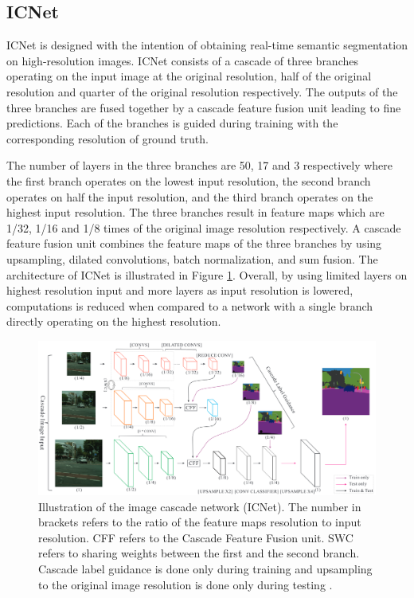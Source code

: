 \subsection{ICNet}

ICNet \cite{DBLP:journals/corr/ZhaoQSSJ17} is designed with the intention of obtaining real-time semantic segmentation on high-resolution images. ICNet consists of a cascade of three branches operating on the input image at the original resolution, half of the original resolution and quarter of the original resolution respectively. The outputs of the three branches are fused together by a cascade feature fusion unit leading to fine predictions. Each of the branches is guided during training with the corresponding resolution of ground truth. 

The number of layers in the three branches are 50, 17 and 3 respectively where the first branch operates on the lowest input resolution, the second branch operates on half the input resolution, and the third branch operates on the highest input resolution. The three branches result in feature maps which are 1/32, 1/16 and 1/8 times of the original image resolution respectively. A cascade feature fusion unit combines the feature maps of the three branches by using upsampling, dilated convolutions, batch normalization, and sum fusion. The architecture of ICNet is illustrated in Figure \ref{Fig:icnet}. Overall, by using limited layers on highest resolution input and more layers as input resolution is lowered, computations is reduced when compared to a network with a single branch directly operating on the highest resolution. 

	\begin{figure}[h]
		\centering
		\includegraphics[width=1\linewidth]{images/icnet}
		\caption{Illustration of the image cascade network (ICNet). The number in brackets refers to the ratio of the feature maps resolution to input resolution. CFF refers to the Cascade Feature Fusion unit. SWC refers to sharing weights between the first and the second branch. Cascade label guidance is done only during training and upsampling to the original image resolution is done only during testing \cite{DBLP:journals/corr/ZhaoQSSJ17}.}
		\label{Fig:icnet}
	\end{figure}

